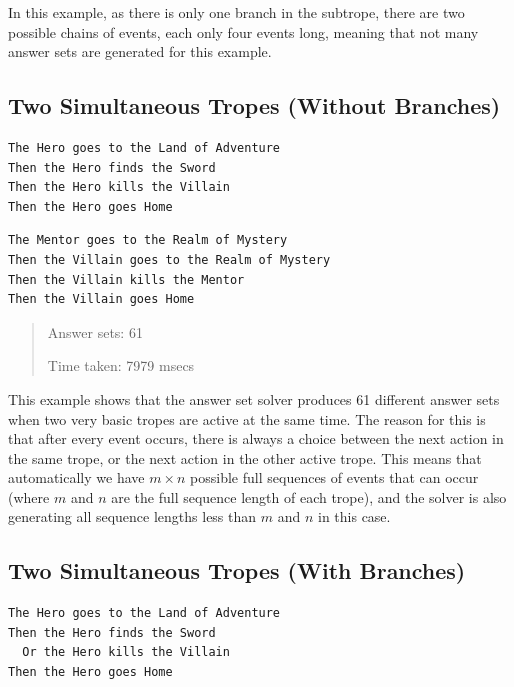 \documentclass[11pt]{report}
\begin{document}
In this example, as there is only one branch in the subtrope, there are two
possible chains of events, each only four events long, meaning that not many
answer sets are generated for this example.

\subsection{Two Simultaneous Tropes (Without Branches)}

\begin{lstlisting}[showstringspaces=false, label={lst:ex-simtrope1},
caption={First of two simultaneous tropes (without branches)}]
The Hero goes to the Land of Adventure
Then the Hero finds the Sword
Then the Hero kills the Villain
Then the Hero goes Home
\end{lstlisting}

\begin{lstlisting}[showstringspaces=false, label={lst:ex-simtrope2},
caption={Second of two simultaneous tropes (without branches)}]
The Mentor goes to the Realm of Mystery
Then the Villain goes to the Realm of Mystery
Then the Villain kills the Mentor
Then the Villain goes Home
\end{lstlisting}

\begin{quote}
  Answer sets: 61

  Time taken: 7979 msecs
\end{quote}

This example shows that the answer set solver produces 61 different answer sets
when two very basic tropes are active at the same time. The reason for this is
that after every event occurs, there is always a choice between
the next action in the same trope, or the next action in the other active trope.
This means that automatically we have $m \times n$ possible full sequences of
events that can occur (where $m$ and $n$ are the full sequence length of each trope), and the solver is also generating all sequence lengths
less than $m$ and $n$ in this case.

\subsection{Two Simultaneous Tropes (With Branches)}

\begin{lstlisting}[showstringspaces=false, label={lst:ex-simtrope1a},
caption={First of two simultaneous tropes (with branches)}]
The Hero goes to the Land of Adventure
Then the Hero finds the Sword
  Or the Hero kills the Villain
Then the Hero goes Home
\end{lstlisting}
\end{document}
